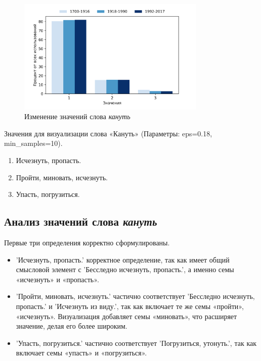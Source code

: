 \begin{figure}[H]
	\centering
	\includegraphics[width=0.8\textwidth]{img/visualizations/kanut'_minimal}
	\caption{Изменение значений слова \textit{кануть}}
	\label{fig:Кануть}
\end{figure}

Значения для визуализации слова «Кануть» (Параметры: eps=0.18, min\_samples=10).

\begin{enumerate}
    \item Исчезнуть, пропасть.
    \item Пройти, миновать, исчезнуть.
    \item Упасть, погрузиться.
\end{enumerate}

\subsection*{Анализ значений слова \textit{кануть}}

Первые три определения корректно сформулированы.

\begin{itemize}
    \item ’Исчезнуть, пропасть.’ корректное определение, так как имеет общий смысловой элемент с
’Бесследно исчезнуть, пропасть.’, а именно семы «исчезнуть» и «пропасть».

    \item ’Пройти, миновать, исчезнуть.’ частично соответствует
’Бесследно исчезнуть, пропасть.’ и ’Исчезнуть из виду.’, так как включает те же семы «пройти», «исчезнуть».
Визуализация добавляет семы «миновать», что расширяет значение, делая его более широким.

    \item ’Упасть, погрузиться.’ частично соответствует ’Погрузиться, утонуть.’,
так как включает семы «упасть» и «погрузиться».
\end{itemize}

